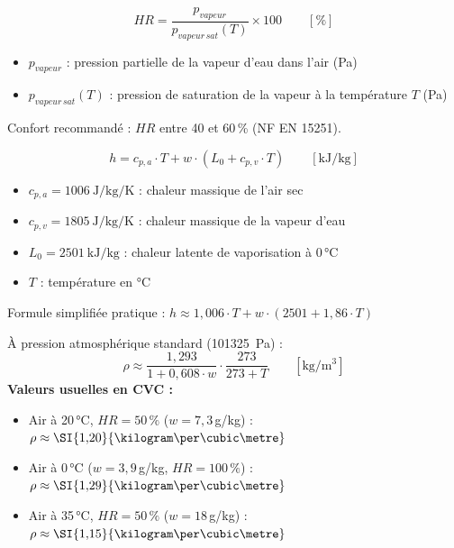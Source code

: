 \begin{definition}[title=Humidité relative]
\begin{equation}
  HR = \frac{p_{vapeur}}{p_{vapeur\,sat}(T)} \times 100 \qquad [\%]
\end{equation}
\begin{itemize}
  \item $p_{vapeur}$ : pression partielle de la vapeur d'eau dans l'air (\si{\pascal})
  \item $p_{vapeur\,sat}(T)$ : pression de saturation de la vapeur à la température $T$ (\si{\pascal})
\end{itemize}
Confort recommandé : $HR$ entre 40 et 60\,\% (NF EN 15251).
\end{definition}

\begin{definition}[title=Enthalpie de l'air humide]
\begin{equation}
  h = c_{p,a} \cdot T + w \cdot (L_0 + c_{p,v} \cdot T) \qquad \left[\si{\kilo\joule\per\kilogram}\right]
\end{equation}
\begin{itemize}
  \item $c_{p,a} = \SI{1006}{\joule\per\kilogram\per\kelvin}$ : chaleur massique de l'air sec
  \item $c_{p,v} = \SI{1805}{\joule\per\kilogram\per\kelvin}$ : chaleur massique de la vapeur d'eau
  \item $L_0 = \SI{2501}{\kilo\joule\per\kilogram}$ : chaleur latente de vaporisation à 0\,°C
  \item $T$ : température en °C
\end{itemize}
Formule simplifiée pratique : $h \approx 1{,}006 \cdot T + w \cdot (2501 + 1{,}86 \cdot T)$
\end{definition}

\begin{definition}[title=Masse volumique de l'air humide]
À pression atmosphérique standard (\SI{101325}{\pascal}) :
\begin{equation}
  \rho \approx \frac{1{,}293}{1 + 0{,}608 \cdot w} \cdot \frac{273}{273 + T} \qquad \left[\si{\kilogram\per\cubic\metre}\right]
\end{equation}
\textbf{Valeurs usuelles en CVC :}
\begin{itemize}
  \item Air à 20\,°C, $HR = 50\,\%$ ($w = 7{,}3$\,g/kg) : $\rho \approx \SI{1{,}20}{\kilogram\per\cubic\metre}$
  \item Air à 0\,°C ($w = 3{,}9$\,g/kg, $HR = 100\,\%$) : $\rho \approx \SI{1{,}29}{\kilogram\per\cubic\metre}$
  \item Air à 35\,°C, $HR = 50\,\%$ ($w = 18$\,g/kg) : $\rho \approx \SI{1{,}15}{\kilogram\per\cubic\metre}$
\end{itemize}
\end{definition}

